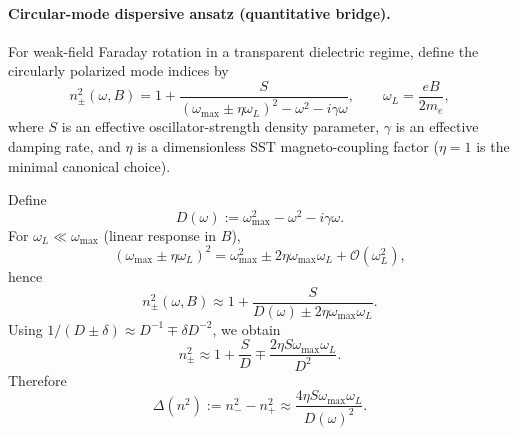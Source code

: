 \documentclass[10pt]{article}
\begin{document}
        \paragraph{Circular-mode dispersive ansatz (quantitative bridge).}
            For weak-field Faraday rotation in a transparent dielectric regime, define the circularly polarized mode indices by
            \begin{equation}
                n_\pm^2(\omega,B)
                =
                1+\frac{S}{\left(\omega_{\max}\pm \eta \omega_L\right)^2-\omega^2-i\gamma\omega},
                \qquad
                \omega_L=\frac{eB}{2m_e},
                \label{eq:sst-faraday-npm}
            \end{equation}
            where \(S\) is an effective oscillator-strength density parameter, \(\gamma\) is an effective damping rate, and \(\eta\) is a dimensionless SST magneto-coupling factor (\(\eta=1\) is the minimal canonical choice).

            Define
            \begin{equation}
                D(\omega):=\omega_{\max}^2-\omega^2-i\gamma\omega .
                \label{eq:sst-faraday-D}
            \end{equation}
            For \(\omega_L\ll \omega_{\max}\) (linear response in \(B\)),
            \begin{equation}
                \left(\omega_{\max}\pm \eta\omega_L\right)^2
                =
                \omega_{\max}^2 \pm 2\eta\omega_{\max}\omega_L+\mathcal{O}(\omega_L^2),
                \label{eq:sst-faraday-cutoff-expansion}
            \end{equation}
            hence
            \begin{equation}
                n_\pm^2(\omega,B)\approx 1+\frac{S}{D(\omega)\pm 2\eta\omega_{\max}\omega_L}.
                \label{eq:sst-faraday-npm-denom-linearized}
            \end{equation}
            Using \(1/(D\pm \delta)\approx D^{-1}\mp \delta D^{-2}\), we obtain
            \begin{equation}
                n_\pm^2
                \approx
                1+\frac{S}{D}
                \mp
                \frac{2\eta S\omega_{\max}\omega_L}{D^2}.
                \label{eq:sst-faraday-npm-expanded}
            \end{equation}
            Therefore
            \begin{equation}
                \Delta(n^2):=n_-^2-n_+^2
                \approx
                \frac{4\eta S\omega_{\max}\omega_L}{D(\omega)^2}.
                \label{eq:sst-faraday-delta-n2}
            \end{equation}
\end{document}
